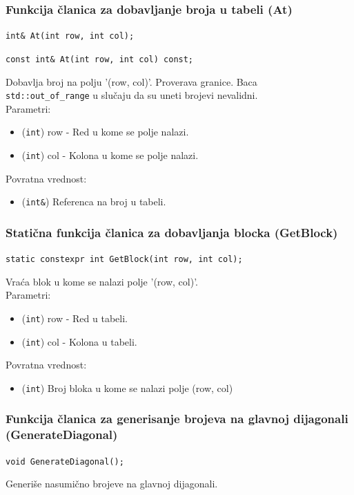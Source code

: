 \documentclass[a4paper]{article}
\begin{document}
    \subsubsection{Funkcija članica za dobavljanje broja u tabeli (At)}
    \texttt{int\& At(int row, int col);}
    \par\texttt{const int\& At(int row, int col) const;}
    \par Dobavlja broj na polju '(row, col)'. Proverava granice. Baca \\ \texttt{std::out\_of\_range} u slučaju da
    su uneti brojevi nevalidni.\\
    Parametri:
    \begin{itemize}
        \item (\texttt{int}) row - Red u kome se polje nalazi.
        \item (\texttt{int}) col - Kolona u kome se polje nalazi.
    \end{itemize}
    Povratna vrednost:
    \begin{itemize}
        \item (\texttt{int\&}) Referenca na broj u tabeli.
    \end{itemize}
    
    \subsubsection{Statična funkcija članica za dobavljanja blocka (GetBlock)}
    \texttt{static constexpr int GetBlock(int row, int col);}
    \par Vraća blok u kome se nalazi polje '(row, col)'.\\
    Parametri:
    \begin{itemize}
        \item (\texttt{int}) row - Red u tabeli.
        \item (\texttt{int}) col - Kolona u tabeli.
    \end{itemize}
    Povratna vrednost:
    \begin{itemize}
        \item (\texttt{int}) Broj bloka u kome se nalazi polje (row, col)
    \end{itemize}

    \subsubsection{Funkcija članica za generisanje brojeva na glavnoj dijagonali (GenerateDiagonal)}
	\texttt{void GenerateDiagonal();}
	\par Generiše nasumično brojeve na glavnoj dijagonali.
\end{document}
